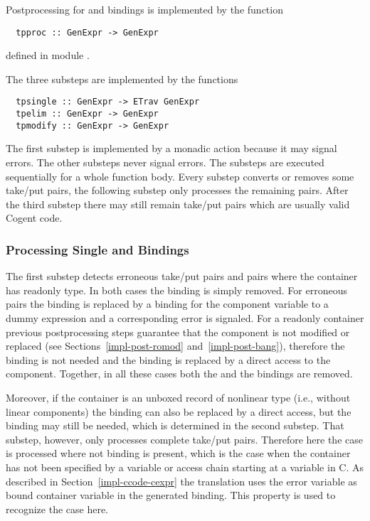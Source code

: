 Postprocessing for  and  bindings is implemented by the function
\begin{verbatim}
  tpproc :: GenExpr -> GenExpr
\end{verbatim}
defined in module .

The three substeps are implemented by the functions
\begin{verbatim}
  tpsingle :: GenExpr -> ETrav GenExpr
  tpelim :: GenExpr -> GenExpr
  tpmodify :: GenExpr -> GenExpr
\end{verbatim}
The first substep is implemented by a monadic action because it may signal errors. The other substeps never signal errors.
The substeps are executed sequentially for a whole function body. Every substep converts or removes some take/put pairs, the following
substep only processes the remaining pairs. After the third substep there may still remain take/put pairs which are usually valid
Cogent code.

\subsubsection{Processing Single  and  Bindings}

The first substep detects erroneous take/put pairs and pairs where the container has readonly type. In both cases the  binding
is simply removed. For erroneous pairs the  binding is replaced by a binding for the component variable to a
dummy expression and a corresponding error is signaled. For a readonly container previous postprocessing steps guarantee
that the component is not modified or replaced (see Sections~\ref{impl-post-romod} and~\ref{impl-post-bang}), therefore the
 binding is not needed and the  binding is replaced by a direct access to the component. Together, in
all these cases both the  and the  bindings are removed.

Moreover, if the container is an unboxed record of nonlinear type (i.e., without linear components) the  binding
can also be replaced by a direct access, but the  binding may still be needed, which is determined in the second
substep. That substep, however, only processes complete take/put pairs. Therefore here the case is processed where not 
binding is present, which is the case when the container has not been specified by a variable or access chain starting at a
variable in C. As described in Section~\ref{impl-ccode-cexpr} the translation uses the error variable as bound container variable
in the generated  binding. This property is used to recognize the case here.


